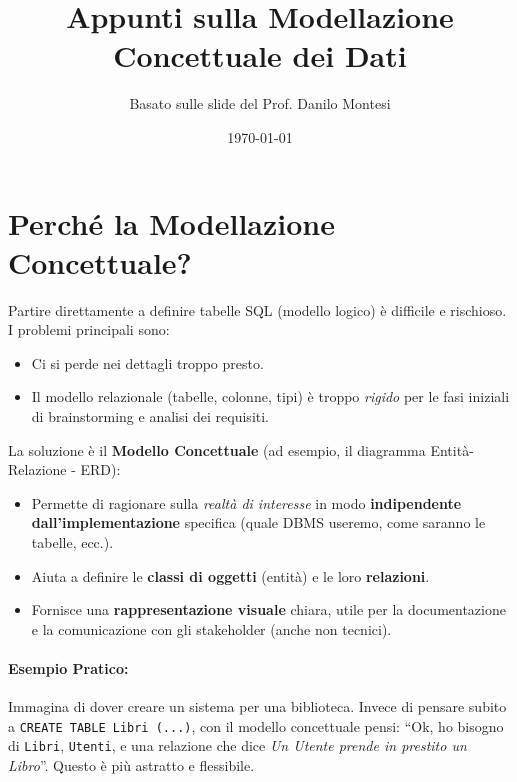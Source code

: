

\usepackage{hyperref}

\title{Appunti sulla Modellazione Concettuale dei Dati}
\author{Basato sulle slide del Prof. Danilo Montesi}
\date{\today}


	
	\maketitle
	\tableofcontents
	\newpage
	
	\section{Perché la Modellazione Concettuale?}
	
	Partire direttamente a definire tabelle SQL (modello logico) è difficile e rischioso. I problemi principali sono:
	\begin{itemize}
		\item Ci si perde nei dettagli troppo presto.
		\item Il modello relazionale (tabelle, colonne, tipi) è troppo \textit{rigido} per le fasi iniziali di brainstorming e analisi dei requisiti.
	\end{itemize}
	
	La soluzione è il \textbf{Modello Concettuale} (ad esempio, il diagramma Entità-Relazione - ERD):
	\begin{itemize}
		\item Permette di ragionare sulla \textit{realtà di interesse} in modo \textbf{indipendente dall'implementazione} specifica (quale DBMS useremo, come saranno le tabelle, ecc.).
		\item Aiuta a definire le \textbf{classi di oggetti} (entità) e le loro \textbf{relazioni}.
		\item Fornisce una \textbf{rappresentazione visuale} chiara, utile per la documentazione e la comunicazione con gli stakeholder (anche non tecnici).
	\end{itemize}
	
	\paragraph{Esempio Pratico:} Immagina di dover creare un sistema per una biblioteca. Invece di pensare subito a \texttt{CREATE TABLE Libri (...)}, con il modello concettuale pensi: ``Ok, ho bisogno di \texttt{Libri}, \texttt{Utenti}, e una relazione che dice \textit{Un Utente prende in prestito un Libro}''. Questo è più astratto e flessibile.
	
